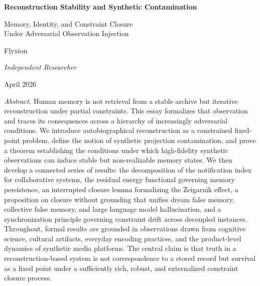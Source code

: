 \documentclass[12pt, letterpaper]{article}
\theoremstyle{flyxion}
\begin{document}
\begin{titlepage}
  \begin{center}
    \vspace*{2.5cm}

    {\fontsize{22}{28}\selectfont\bfseries\color{titleblue}
      Reconstruction Stability and Synthetic Contamination}

    \vspace{0.4cm}

    {\fontsize{14}{20}\selectfont\color{sectiongray}
      Memory, Identity, and Constraint Closure\\
      Under Adversarial Observation Injection}

    \vspace{1.8cm}

    {\large Flyxion}

    \vspace{0.3cm}

    {\normalsize\textit{Independent Researcher}}

    \vspace{0.3cm}

    {\normalsize April 2026}

    \vspace{3cm}

    \begin{minipage}{0.82\textwidth}
      \normalsize{}
      \textit{Abstract.} Human memory is not retrieval from a stable archive but iterative reconstruction under partial constraints. This essay formalizes that observation and traces its consequences across a hierarchy of increasingly adversarial conditions. We introduce autobiographical reconstruction as a constrained fixed-point problem, define the notion of synthetic projection contamination, and prove a theorem establishing the conditions under which high-fidelity synthetic observations can induce stable but non-realizable memory states. We then develop a connected series of results: the decomposition of the notification index for collaborative systems, the residual energy functional governing memory persistence, an interrupted closure lemma formalizing the Zeigarnik effect, a proposition on closure without grounding that unifies dream false memory, collective false memory, and large language model hallucination, and a synchronization principle governing constraint drift across decoupled instances. Throughout, formal results are grounded in observations drawn from cognitive science, cultural artifacts, everyday encoding practices, and the product-level dynamics of synthetic media platforms. The central claim is that truth in a reconstruction-based system is not correspondence to a stored record but survival as a fixed point under a sufficiently rich, robust, and externalized constraint closure process.
    \end{minipage}

  \end{center}
\end{titlepage}
\end{document}
